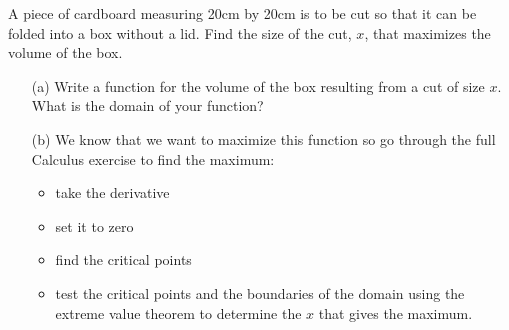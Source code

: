 \begin{problem}\label{prob:cardboard}
    A piece of cardboard measuring 20cm by 20cm is to be cut so that it can be folded into
    a box without a lid. Find the size of the cut, $x$, that maximizes the volume of the
    box. 
    \begin{center}
    \end{center}
    \begin{enumerate}
        \item[(a)] Write a function for the volume of the box resulting from a cut of size
            $x$.  What is the domain of your function?
        \item[(b)] We know that we want to maximize this function so go through the
            full Calculus exercise to find the maximum:
            \begin{itemize}
                \item take the derivative
                \item set it to zero
                \item find the critical points
                \item test the critical points and the boundaries of the domain using the
                    extreme value theorem to determine the $x$ that gives the maximum.
            \end{itemize}
    \end{enumerate}
\end{problem}

